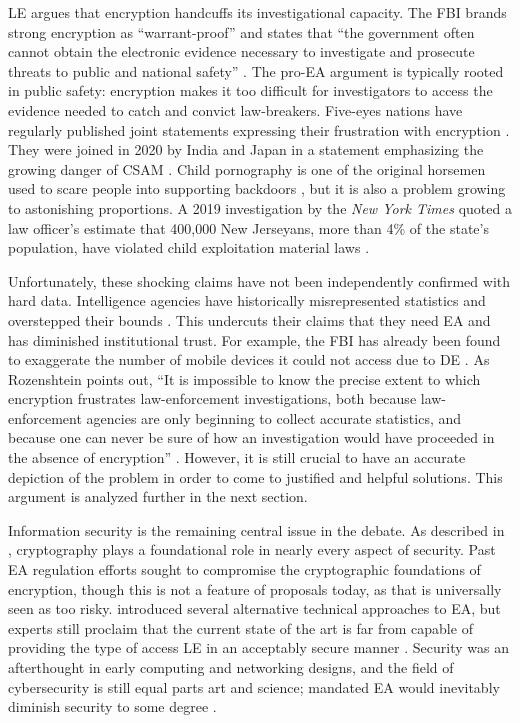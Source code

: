 \Acl{LE} argues that encryption handcuffs its investigational capacity. The \ac{FBI} brands strong encryption as
``warrant-proof'' and states that ``the government often cannot obtain the electronic evidence necessary to investigate
and prosecute threats to public and national safety'' \cite{fbi_2020}. The pro-\ac{EA} argument is typically rooted in
public safety: encryption makes it too difficult for investigators to access the evidence needed to catch and convict
law-breakers. Five-eyes nations have regularly published joint statements expressing their frustration with encryption
\cite{ministerial_2018} \cite{goodale_2017}. They were joined in 2020 by India and Japan in a statement emphasizing the
growing danger of \ac{CSAM} \cite{intl_2020}. Child pornography is one of the original \ac{horsemen} used to scare
people into supporting backdoors \cite{schneier_scaring_2019}, but it is also a problem growing to astonishing
proportions. A 2019 investigation by the \textit{New York Times} quoted a law officer's estimate that 400,000 New
Jerseyans, more than 4\% of the state's population, have violated child exploitation material laws
\cite{keller_internet_2019}.

Unfortunately, these shocking claims have not been independently confirmed with hard data. Intelligence agencies have
historically misrepresented statistics and overstepped their bounds \cite{johnson_congressional_2004}
\cite{shamsi_2011}. This undercuts their claims that they need \ac{EA} and has diminished institutional trust. For
example, the \ac{FBI} has already been found to exaggerate the number of mobile devices it could not access due to
\acl{DE} \cite{devlin_2018}. As Rozenshtein points out, ``It is impossible to know the precise extent to which
encryption frustrates law-enforcement investigations, both because law-enforcement agencies are only beginning to
collect accurate statistics, and because one can never be sure of how an investigation would have proceeded in the
absence of encryption'' \cite{rozenshtein_wicked_2018}. However, it is still crucial to have an accurate depiction of
the problem in order to come to justified and helpful solutions. This argument is analyzed further in the next section.

Information security is the remaining central issue in the debate. As described in ,
\ac{cryptography} plays a foundational role in nearly every aspect of security. Past \ac{EA} regulation efforts sought
to compromise the cryptographic foundations of encryption, though this is not a feature of proposals today, as that is
universally seen as too risky.  introduced several alternative technical approaches to
\ac{EA}, but experts still proclaim that the current state of the art is far from capable of providing the type of
access \acl{LE} in an acceptably secure manner \cite{abelson_2015} \cite{abelson_risks_1997}. Security was an
afterthought in early computing and networking designs, and the field of cybersecurity is still equal parts art and
science; mandated \ac{EA} would inevitably diminish security to some degree \cite{abelson_2015}.

